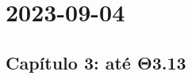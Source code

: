 \documentclass[a4paper, 12pt]{article}
\begin{document}
\section{2023-09-04}

\subsection*{Capítulo 3: até Θ3.13}
%
\end{document}
